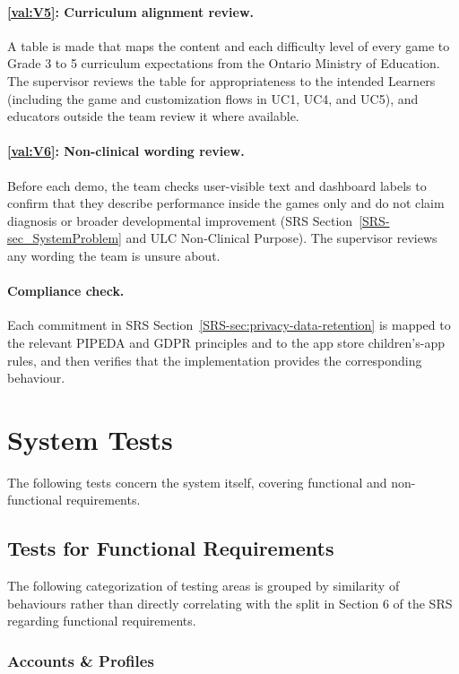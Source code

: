 \documentclass[12pt, titlepage]{article}
\newcommand{\valref}[1]{\hyperref[val:V#1]{\ref*{val:V#1}}}
\newcommand{\srssectionref}[1]{SRS Section~\ref*{SRS-#1}}
\newcommand{\srsnamedref}[2]{#2}
\begin{document}
\paragraph{\valref{5}: Curriculum alignment review.} A table is made that maps the content and each difficulty level of every game to Grade 3 to 5 curriculum
expectations from the Ontario Ministry of Education. The supervisor reviews the
table for appropriateness to the intended Learners (including the game and customization flows in UC1, UC4, and UC5), and educators outside the
team review it where available.

\paragraph{\valref{6}: Non-clinical wording review.} Before each demo, the team checks
user-visible text and dashboard labels to confirm that they describe
performance inside the games only and do not claim diagnosis or broader
developmental improvement (\srssectionref{sec_SystemProblem} and \srsnamedref{ULC_NonClinicalPurpose}{ULC Non-Clinical Purpose}). The supervisor reviews any
wording the team is unsure about.

\paragraph{Compliance check.} Each commitment in \srssectionref{sec:privacy-data-retention} is mapped to
the relevant PIPEDA and GDPR principles and to the app store children's-app
rules, and then verifies that the implementation provides the corresponding
behaviour.


\section{System Tests}

The following tests concern the system itself, covering functional and non-functional requirements.

\subsection{Tests for Functional Requirements}

The following categorization of testing areas is grouped by similarity of behaviours rather than directly correlating with the split in Section 6 of the SRS regarding functional requirements.

\subsubsection{Accounts \& Profiles}
\end{document}
